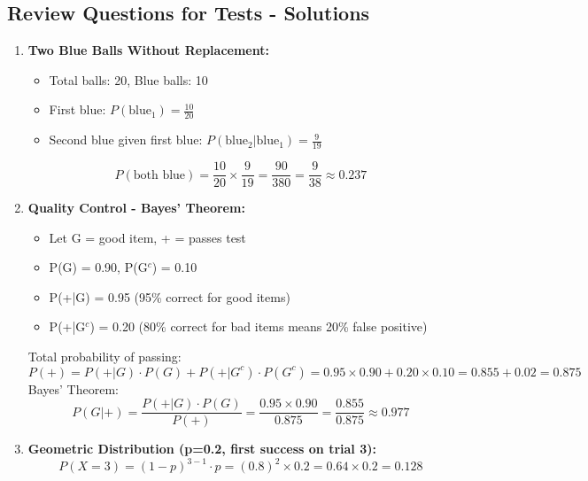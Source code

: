 \subsection{Review Questions for Tests - Solutions}

\begin{enumerate}
    \item \textbf{Two Blue Balls Without Replacement:}
    \begin{itemize}
        \item Total balls: 20, Blue balls: 10
        \item First blue: $P(\text{blue}_1) = \frac{10}{20}$
        \item Second blue given first blue: $P(\text{blue}_2 | \text{blue}_1) = \frac{9}{19}$
    \end{itemize}
    \begin{equation}
        P(\text{both blue}) = \frac{10}{20} \times \frac{9}{19} = \frac{90}{380} = \frac{9}{38} \approx 0.237
    \end{equation}
    
    \item \textbf{Quality Control - Bayes' Theorem:}
    \begin{itemize}
        \item Let G = good item, + = passes test
        \item P(G) = 0.90, P(G$^c$) = 0.10
        \item P(+|G) = 0.95 (95\% correct for good items)
        \item P(+|G$^c$) = 0.20 (80\% correct for bad items means 20\% false positive)
    \end{itemize}
    Total probability of passing:
    \begin{equation}
        P(+) = P(+|G) \cdot P(G) + P(+|G^c) \cdot P(G^c) = 0.95 \times 0.90 + 0.20 \times 0.10 = 0.855 + 0.02 = 0.875
    \end{equation}
    Bayes' Theorem:
    \begin{equation}
        P(G|+) = \frac{P(+|G) \cdot P(G)}{P(+)} = \frac{0.95 \times 0.90}{0.875} = \frac{0.855}{0.875} \approx 0.977
    \end{equation}
    
    \item \textbf{Geometric Distribution (p=0.2, first success on trial 3):}
    \begin{equation}
        P(X = 3) = (1-p)^{3-1} \cdot p = (0.8)^2 \times 0.2 = 0.64 \times 0.2 = 0.128
    \end{equation}
    

\end{enumerate}

